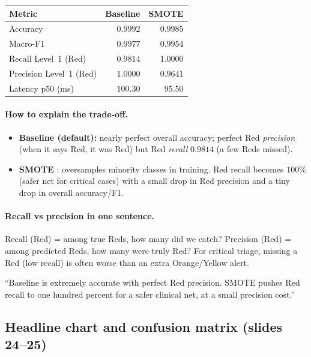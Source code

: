 \begin{center}
\small
\begin{tabular}{@{}lrr@{}}
\toprule
Metric & Baseline & SMOTE \\
\midrule
Accuracy & \(0.9992\) & \(0.9985\) \\
Macro-F1 & \(0.9977\) & \(0.9954\) \\
Recall Level~1 (Red) & \(0.9814\) & \(1.0000\) \\
Precision Level~1 (Red) & \(1.0000\) & \(0.9641\) \\
Latency p50 (ms) & \(100.30\) & \(95.50\) \\
\bottomrule
\end{tabular}
\end{center}

\paragraph{How to explain the trade-off.}
\begin{itemize}
  \item \textbf{Baseline (default):} nearly perfect overall accuracy; perfect Red \emph{precision}
    (when it says Red, it was Red) but Red \emph{recall} \(0.9814\) (a few Reds missed).
  \item \textbf{SMOTE} \citep{chawla2002smote}: oversamples minority classes in training.
    Red recall becomes \(100\%\) (safer net for critical cases) with a small drop in Red precision
    and a tiny drop in overall accuracy/F1.
\end{itemize}

\paragraph{Recall vs precision in one sentence.}
Recall (Red) = among true Reds, how many did we catch?
Precision (Red) = among predicted Reds, how many were truly Red?
For critical triage, missing a Red (low recall) is often worse than an extra Orange/Yellow alert.

\begin{saybox}
``Baseline is extremely accurate with perfect Red precision. SMOTE pushes Red recall to one hundred percent for a safer clinical net, at a small precision cost.''
\end{saybox}

\subsection{Headline chart and confusion matrix (slides 24--25)}

